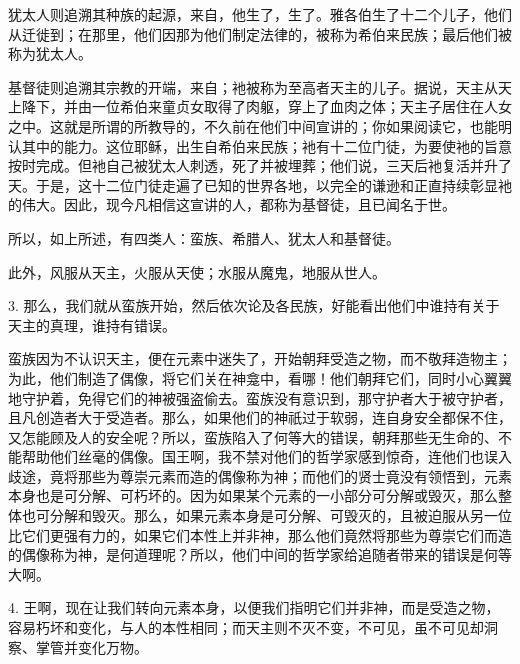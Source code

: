 犹太人则追溯其种族的起源，来自，他生了，生了。雅各伯生了十二个儿子，他们从迁徙到；在那里，他们因那为他们制定法律的，被称为希伯来民族；最后他们被称为犹太人。\par

基督徒则追溯其宗教的开端，来自；衪被称为至高者天主的儿子。据说，天主从天上降下，并由一位希伯来童贞女取得了肉躯，穿上了血肉之体；天主子居住在人女之中。这就是所谓的所教导的，不久前在他们中间宣讲的；你如果阅读它，也能明认其中的能力。这位耶稣，出生自希伯来民族；衪有十二位门徒，为要使衪的旨意按时完成。但衪自己被犹太人刺透，死了并被埋葬；他们说，三天后衪复活并升了天。于是，这十二位门徒走遍了已知的世界各地，以完全的谦逊和正直持续彰显衪的伟大。因此，现今凡相信这宣讲的人，都称为基督徒，且已闻名于世。\par

所以，如上所述，有四类人：蛮族、希腊人、犹太人和基督徒。\par

此外，风服从天主，火服从天使；水服从魔鬼，地服从世人。\par

3. 那么，我们就从蛮族开始，然后依次论及各民族，好能看出他们中谁持有关于天主的真理，谁持有错误。\par

蛮族因为不认识天主，便在元素中迷失了，开始朝拜受造之物，而不敬拜造物主；为此，他们制造了偶像，将它们关在神龛中，看哪！他们朝拜它们，同时小心翼翼地守护着，免得它们的神被强盗偷去。蛮族没有意识到，那守护者大于被守护者，且凡创造者大于受造者。那么，如果他们的神祇过于软弱，连自身安全都保不住，又怎能顾及人的安全呢？所以，蛮族陷入了何等大的错误，朝拜那些无生命的、不能帮助他们丝毫的偶像。国王啊，我不禁对他们的哲学家感到惊奇，连他们也误入歧途，竟将那些为尊崇元素而造的偶像称为神；而他们的贤士竟没有领悟到，元素本身也是可分解、可朽坏的。因为如果某个元素的一小部分可分解或毁灭，那么整体也可分解和毁灭。那么，如果元素本身是可分解、可毁灭的，且被迫服从另一位比它们更强有力的，如果它们本性上并非神，那么他们竟然将那些为尊崇它们而造的偶像称为神，是何道理呢？所以，他们中间的哲学家给追随者带来的错误是何等大啊。\par

4. 王啊，现在让我们转向元素本身，以便我们指明它们并非神，而是受造之物，容易朽坏和变化，与人的本性相同；而天主则不灭不变，不可见，虽不可见却洞察、掌管并变化万物。\par

